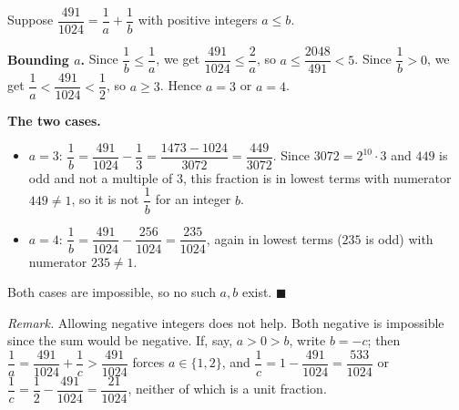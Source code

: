 Suppose $\dfrac{491}{1024}=\dfrac{1}{a}+\dfrac{1}{b}$ with positive integers $a\le b$.

\textbf{Bounding $a$.} Since $\dfrac{1}{b}\le\dfrac{1}{a}$, we get $\dfrac{491}{1024}\le\dfrac{2}{a}$, so $a\le\dfrac{2048}{491}<5$. Since $\dfrac{1}{b}>0$, we get $\dfrac{1}{a}<\dfrac{491}{1024}<\dfrac{1}{2}$, so $a\ge3$. Hence $a=3$ or $a=4$.

\textbf{The two cases.}
\begin{itemize}
\item $a=3$: $\dfrac{1}{b}=\dfrac{491}{1024}-\dfrac{1}{3}=\dfrac{1473-1024}{3072}=\dfrac{449}{3072}$. Since $3072=2^{10}\cdot3$ and $449$ is odd and not a multiple of $3$, this fraction is in lowest terms with numerator $449\ne1$, so it is not $\dfrac{1}{b}$ for an integer $b$.
\item $a=4$: $\dfrac{1}{b}=\dfrac{491}{1024}-\dfrac{256}{1024}=\dfrac{235}{1024}$, again in lowest terms ($235$ is odd) with numerator $235\ne1$.
\end{itemize}
Both cases are impossible, so no such $a,b$ exist. $\blacksquare$

\emph{Remark.} Allowing negative integers does not help. Both negative is impossible since the sum would be negative. If, say, $a>0>b$, write $b=-c$; then $\dfrac{1}{a}=\dfrac{491}{1024}+\dfrac{1}{c}>\dfrac{491}{1024}$ forces $a\in\{1,2\}$, and $\dfrac{1}{c}=1-\dfrac{491}{1024}=\dfrac{533}{1024}$ or $\dfrac{1}{c}=\dfrac{1}{2}-\dfrac{491}{1024}=\dfrac{21}{1024}$, neither of which is a unit fraction.
